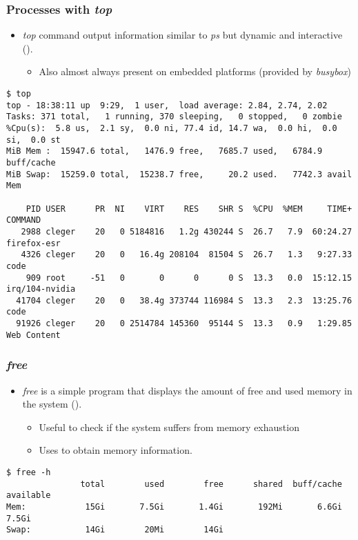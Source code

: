 \begin{frame}[fragile]
  \frametitle{Processes with {\em top}}
  \begin{itemize}
    \item {\em top} command output information similar to {\em ps} but dynamic
          and interactive ().
    \begin{itemize}
      \item Also almost always present on embedded platforms (provided by
            {\em busybox})
    \end{itemize}
  \end{itemize}
  \begin{block}{}
    \begin{verbatim}
$ top
top - 18:38:11 up  9:29,  1 user,  load average: 2.84, 2.74, 2.02
Tasks: 371 total,   1 running, 370 sleeping,   0 stopped,   0 zombie
%Cpu(s):  5.8 us,  2.1 sy,  0.0 ni, 77.4 id, 14.7 wa,  0.0 hi,  0.0 si,  0.0 st
MiB Mem :  15947.6 total,   1476.9 free,   7685.7 used,   6784.9 buff/cache
MiB Swap:  15259.0 total,  15238.7 free,     20.2 used.   7742.3 avail Mem

    PID USER      PR  NI    VIRT    RES    SHR S  %CPU  %MEM     TIME+ COMMAND
   2988 cleger    20   0 5184816   1.2g 430244 S  26.7   7.9  60:24.27 firefox-esr
   4326 cleger    20   0   16.4g 208104  81504 S  26.7   1.3   9:27.33 code
    909 root     -51   0       0      0      0 S  13.3   0.0  15:12.15 irq/104-nvidia
  41704 cleger    20   0   38.4g 373744 116984 S  13.3   2.3  13:25.76 code
  91926 cleger    20   0 2514784 145360  95144 S  13.3   0.9   1:29.85 Web Content
    \end{verbatim}
  \end{block}
\end{frame}

\begin{frame}[fragile]
  \frametitle{{\em free}}
  \begin{itemize}
    \item {\em free} is a simple program that displays the amount of free and
          used memory in the system ().
    \begin{itemize}
      \item Useful to check if the system suffers from memory exhaustion
      \item Uses  to obtain memory information.
    \end{itemize}
  \end{itemize}
  \begin{block}{}
    \begin{verbatim}
$ free -h
               total        used        free      shared  buff/cache   available
Mem:            15Gi       7.5Gi       1.4Gi       192Mi       6.6Gi       7.5Gi
Swap:           14Gi        20Mi        14Gi
    \end{verbatim}
  \end{block}
\end{frame}

